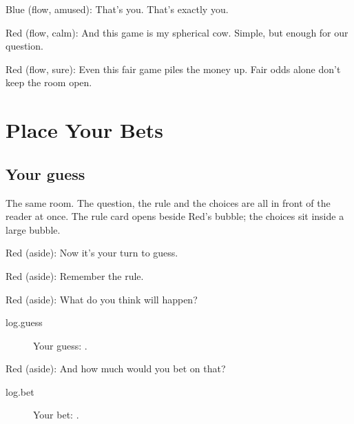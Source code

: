 Blue (flow, amused): That's you. That's exactly you.

Red (flow, calm): And this game is my spherical cow.
Simple, but enough for our question.

Red (flow, sure): Even this fair game piles the money up.
Fair odds alone don't keep the room open.

\section{Place Your Bets}\label{index:what-could-go-wrong}

\subsection{Your guess}\label{act:guess}

\label{guess}

The same room. The question, the rule and the choices are all in front of
the reader at once. The rule card opens beside Red's bubble; the choices sit
inside a large bubble.


Red (aside): Now it's your turn to guess.

Red (aside): Remember the \gls{rule}.

Red (aside): What do you think will happen?

\begin{description}
  \item[log.guess] Your guess: .
\end{description}

Red (aside): And how much would you bet on that?

\begin{description}
  \item[log.bet] Your bet: .
\end{description}

